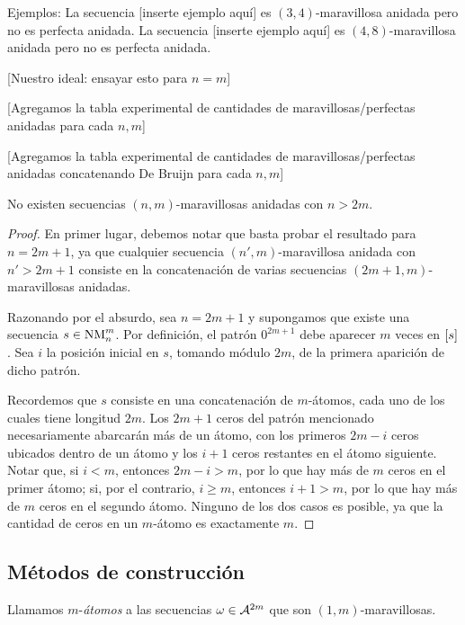 \documentclass[11pt]{article}
\begin{document}
Ejemplos: La secuencia [inserte ejemplo aquí] es $(3, 4)$-maravillosa anidada pero no es perfecta anidada.
La secuencia [inserte ejemplo aquí] es $(4, 8)$-maravillosa anidada pero no es perfecta anidada.

	[Nuestro ideal: ensayar esto para $n = m$]

	[Agregamos la tabla experimental de cantidades de maravillosas/perfectas anidadas para cada $n, m$]

	[Agregamos la tabla experimental de cantidades de maravillosas/perfectas anidadas concatenando De Bruijn para cada $n, m$]

\begin{proposition}
	No existen secuencias $(n,m)$-maravillosas anidadas con $n > 2m$.
\end{proposition}

\begin{proof}
	En primer lugar, debemos notar que basta probar el resultado para $n = 2m +
		1$, ya que cualquier secuencia $(n',m)$-maravillosa anidada con $n' > 2m +
		1$ consiste en la concatenación de varias secuencias
	$(2m+1,m)$-maravillosas anidadas.

	Razonando por el absurdo, sea $n = 2m + 1$ y supongamos que existe una
	secuencia $s \in \text{NM}_{n}^{m}$. Por definición, el patrón $0^{2m+1}$ debe
	aparecer $m$ veces en $\left[s\right]$. Sea $i$ la posición inicial en $s$, tomando
	módulo $2m$, de la primera aparición de dicho patrón.

	Recordemos que $s$ consiste en una concatenación de $m$-átomos, cada uno de
	los cuales tiene longitud $2m$. Los $2m+1$ ceros del patrón mencionado
	necesariamente abarcarán más de un átomo, con los primeros $2m - i$ ceros
	ubicados dentro de un átomo y los $i + 1$ ceros restantes en el átomo
	siguiente. Notar que, si $i < m$, entonces $2m - i > m$, por lo que hay más
	de $m$ ceros en el primer átomo; si, por el contrario, $i \geq m$, entonces
	$i + 1 > m$, por lo que hay más de $m$ ceros en el segundo átomo. Ninguno
	de los dos casos es posible, ya que la cantidad de ceros en un $m$-átomo es
	exactamente $m$.
\end{proof}

\subsection{Métodos de construcción}

\begin{definition}
	Llamamos $m$-\emph{átomos} a las secuencias $\omega \in \mathcal{A}^{2m}$ que
	son $(1,m)$-maravillosas.
\end{definition}
\end{document}
